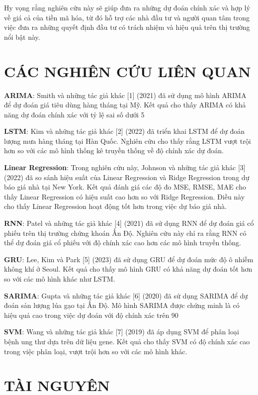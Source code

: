 \documentclass[conference]{IEEEtran}
\begin{document}
Hy vọng rằng nghiên cứu này sẽ giúp đưa ra những dự đoán chính xác và hợp lý về giá cả của tiền mã hóa, từ đó hỗ trợ các nhà đầu tư và người quan tâm trong việc đưa ra những quyết định đầu tư có trách nhiệm và hiệu quả trên thị trường nổi bật này.

\section{CÁC NGHIÊN CỨU LIÊN QUAN}
\textbf{ARIMA}: Smith và những tác giả khác [1] (2021) đã sử dụng mô hình ARIMA để dự đoán giá tiêu dùng hàng tháng tại Mỹ. Kết quả cho thấy ARIMA có khả năng dự đoán chính xác với tỷ lệ sai số dưới 5%

\textbf{LSTM}: Kim và những tác giả khác [2] (2022) đã triển khai LSTM để dự đoán lượng mưa hàng tháng tại Hàn Quốc. Nghiên cứu cho thấy rằng LSTM vượt trội hơn so với các mô hình thống kê truyền thống về độ chính xác dự đoán.

\textbf{Linear Regression}: Trong nghiên cứu này, Johnson và những tác giả khác [3] (2022) đã so sánh hiệu suất của Linear Regression và Ridge Regression trong dự báo giá nhà tại New York. Kết quả đánh giá các độ đo MSE, RMSE, MAE cho thấy Linear Regression có hiệu suất cao hơn so với Ridge Regression. Điều này cho thấy Linear Regression hoạt động tốt hơn trong việc dự báo giá nhà.

\textbf{RNN}: Patel và những tác giả khác [4] (2021) đã sử dụng RNN để dự đoán giá cổ phiếu trên thị trường chứng khoán Ấn Độ. Nghiên cứu này chỉ ra rằng RNN có thể dự đoán giá cổ phiếu với độ chính xác cao hơn các mô hình truyền thống.

\textbf{GRU}: Lee, Kim và Park [5] (2023) đã sử dụng GRU để dự đoán mức độ ô nhiễm không khí ở Seoul. Kết quả cho thấy mô hình GRU có khả năng dự đoán tốt hơn so với các mô hình khác như LSTM.

\textbf{SARIMA}: Gupta và những tác giả khác [6] (2020) đã sử dụng SARIMA để dự đoán sản lượng lúa gạo tại Ấn Độ. Mô hình SARIMA được chứng minh là có hiệu quả cao trong việc dự đoán với độ chính xác trên 90%

\textbf{SVM}: Wang và những tác giả khác [7] (2019) đã áp dụng SVM để phân loại bệnh ung thư dựa trên dữ liệu gene. Kết quả cho thấy SVM có độ chính xác cao trong việc phân loại, vượt trội hơn so với các mô hình khác.

\section{TÀI NGUYÊN}
\end{document}
